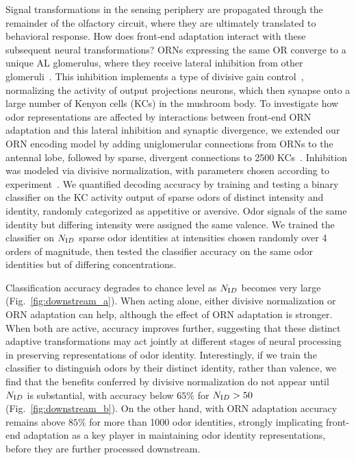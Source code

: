 \documentclass[9pt,twocolumn,twoside,lineno]{pnas-new}
\begin{document}
Signal transformations in the sensing periphery are propagated through the remainder of the olfactory circuit, where they are ultimately translated to behavioral response. How does front-end adaptation interact with these subsequent neural transformations? ORNs expressing the same OR converge to a unique AL glomerulus, where they receive lateral inhibition from other glomeruli~\cite{lateral_inh, lateral_inh_asahina}. This inhibition implements a type of divisive gain control~\cite{divisive_normalization}, normalizing the activity of output projections neurons, which then synapse onto a large number of Kenyon cells (KCs) in the mushroom body. %
To investigate how odor representations are affected by interactions between front-end ORN adaptation and this lateral inhibition and synaptic divergence, we extended our ORN encoding model by adding uniglomerular connections from ORNs to the antennal lobe, followed by sparse, divergent connections to 2500 KCs~\cite{memory_review, litwinkumar, abbott_axel}. Inhibition was modeled via divisive normalization, with parameters chosen according to experiment~\cite{divisive_normalization}.
We quantified decoding accuracy by training and testing a binary classifier on the KC activity output of sparse odors of distinct intensity and identity, randomly categorized as appetitive or aversive. Odor signals of the same identity but differing intensity were assigned the same valence. We trained the classifier on $N_{\text ID}$ sparse odor identities at intensities chosen randomly over 4 orders of magnitude, then tested the classifier accuracy on the same odor identities but of differing concentrations. 

Classification accuracy degrades to chance level as $N_{\text ID}$ becomes very large (Fig.~\ref{fig:downstream_a}). When acting alone, either divisive normalization or ORN adaptation can help, although the effect of ORN adaptation is stronger. When both are active, accuracy improves further, suggesting that these distinct adaptive transformations may act jointly at different stages of neural processing in preserving representations of odor identity. Interestingly, if we train the classifier to distinguish odors by their distinct identity, rather than valence, we find that the benefits conferred by divisive normalization do not appear until $N_{\text ID}$ is substantial, with accuracy below $65\%$ for $N_{\text ID} > 50$ (Fig.~\ref{fig:downstream_b}). On the other hand, with ORN adaptation accuracy remains above $85\%$ for more than 1000 odor identities, strongly implicating front-end adaptation as a key player in maintaining odor identity representations, before they are further processed downstream. 
\end{document}
